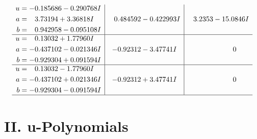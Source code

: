 \documentclass[1p]{elsarticle_modified}
\theoremstyle{definition}
\begin{document}
$$\begin{array}{c|c|c}
\begin{aligned}
u &= -0.185686 - 0.290768 I \\
a &= \phantom{-}3.73194 + 3.36818 I \\
b &= \phantom{-}0.942958 - 0.095108 I\end{aligned}
 & \phantom{-}0.484592 - 0.422993 I & \phantom{-}3.2353 - 15.0846 I \\ \hline\begin{aligned}
u &= \phantom{-}0.13032 + 1.77960 I \\
a &= -0.437102 - 0.021346 I \\
b &= -0.929304 + 0.091594 I\end{aligned}
 & -0.92312 - 3.47741 I & \phantom{-0.000000 } 0 \\ \hline\begin{aligned}
u &= \phantom{-}0.13032 - 1.77960 I \\
a &= -0.437102 + 0.021346 I \\
b &= -0.929304 - 0.091594 I\end{aligned}
 & -0.92312 + 3.47741 I & \phantom{-0.000000 } 0\\
 \hline 
 \end{array}$$\newpage
\newpage\renewcommand{\arraystretch}{1}
\centering \section*{ II. u-Polynomials}
\end{document}
